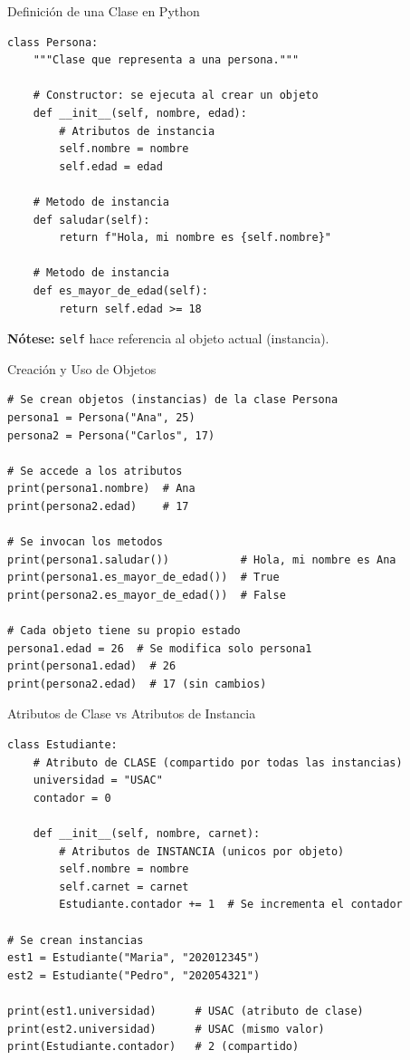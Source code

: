 \documentclass[aspectratio=169]{beamer}
\begin{document}
\begin{frame}[fragile]{Definición de una Clase en Python}
    \begin{lstlisting}[title=Sintaxis Básica de una Clase]
class Persona:
    """Clase que representa a una persona."""
    
    # Constructor: se ejecuta al crear un objeto
    def __init__(self, nombre, edad):
        # Atributos de instancia
        self.nombre = nombre
        self.edad = edad
    
    # Metodo de instancia
    def saludar(self):
        return f"Hola, mi nombre es {self.nombre}"
    
    # Metodo de instancia
    def es_mayor_de_edad(self):
        return self.edad >= 18
    \end{lstlisting}
    
    \textbf{Nótese:} \texttt{self} hace referencia al objeto actual (instancia).
\end{frame}

\begin{frame}[fragile]{Creación y Uso de Objetos}
    \begin{lstlisting}[title=Instanciación de Objetos]
# Se crean objetos (instancias) de la clase Persona
persona1 = Persona("Ana", 25)
persona2 = Persona("Carlos", 17)

# Se accede a los atributos
print(persona1.nombre)  # Ana
print(persona2.edad)    # 17

# Se invocan los metodos
print(persona1.saludar())           # Hola, mi nombre es Ana
print(persona1.es_mayor_de_edad())  # True
print(persona2.es_mayor_de_edad())  # False

# Cada objeto tiene su propio estado
persona1.edad = 26  # Se modifica solo persona1
print(persona1.edad)  # 26
print(persona2.edad)  # 17 (sin cambios)
    \end{lstlisting}
\end{frame}

\begin{frame}[fragile]{Atributos de Clase vs Atributos de Instancia}
    \begin{lstlisting}[title=Tipos de Atributos]
class Estudiante:
    # Atributo de CLASE (compartido por todas las instancias)
    universidad = "USAC"
    contador = 0
    
    def __init__(self, nombre, carnet):
        # Atributos de INSTANCIA (unicos por objeto)
        self.nombre = nombre
        self.carnet = carnet
        Estudiante.contador += 1  # Se incrementa el contador

# Se crean instancias
est1 = Estudiante("Maria", "202012345")
est2 = Estudiante("Pedro", "202054321")

print(est1.universidad)      # USAC (atributo de clase)
print(est2.universidad)      # USAC (mismo valor)
print(Estudiante.contador)   # 2 (compartido)
    \end{lstlisting}
\end{frame}
\end{document}
